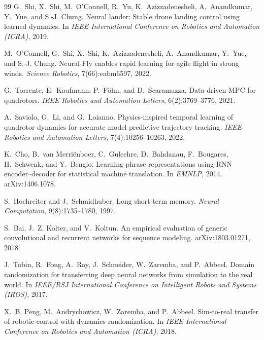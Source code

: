 \documentclass[11pt,a4paper,twoside,openright]{report}
\theoremstyle{plain}
\theoremstyle{definition}
\theoremstyle{remark}
\begin{document}
\begin{thebibliography}{99}
		G.~Shi, X.~Shi, M.~O'Connell, R.~Yu, K.~Azizzadenesheli, A.~Anandkumar, Y.~Yue,
		and S.-J. Chung.
		\newblock Neural lander: Stable drone landing control using learned dynamics.
		\newblock In \emph{IEEE International Conference on Robotics and Automation
			(ICRA)}, 2019.

		M.~O'Connell, G.~Shi, X.~Shi, K.~Azizzadenesheli, A.~Anandkumar, Y.~Yue, and
		S.-J. Chung.
		\newblock Neural-Fly enables rapid learning for agile flight in strong winds.
		\newblock \emph{Science Robotics}, 7(66):eabm6597, 2022.

		G.~Torrente, E.~Kaufmann, P.~F\"ohn, and D.~Scaramuzza.
		\newblock Data-driven MPC for quadrotors.
		\newblock \emph{IEEE Robotics and Automation Letters}, 6(2):3769--3776, 2021.

		A.~Saviolo, G.~Li, and G.~Loianno.
		\newblock Physics-inspired temporal learning of quadrotor dynamics for accurate
		model predictive trajectory tracking.
		\newblock \emph{IEEE Robotics and Automation Letters}, 7(4):10256--10263, 2022.

		K.~Cho, B.~van Merri\"enboer, C.~Gulcehre, D.~Bahdanau, F.~Bougares, H.~Schwenk,
		and Y.~Bengio.
		\newblock Learning phrase representations using RNN encoder--decoder for
		statistical machine translation.
		\newblock In \emph{EMNLP}, 2014. arXiv:1406.1078.

		S.~Hochreiter and J.~Schmidhuber.
		\newblock Long short-term memory.
		\newblock \emph{Neural Computation}, 9(8):1735--1780, 1997.

		S.~Bai, J.~Z. Kolter, and V.~Koltun.
		\newblock An empirical evaluation of generic convolutional and recurrent
		networks for sequence modeling.
		\newblock arXiv:1803.01271, 2018.

		J.~Tobin, R.~Fong, A.~Ray, J.~Schneider, W.~Zaremba, and P.~Abbeel.
		\newblock Domain randomization for transferring deep neural networks from
		simulation to the real world.
		\newblock In \emph{IEEE/RSJ International Conference on Intelligent Robots and
			Systems (IROS)}, 2017.

		X.~B. Peng, M.~Andrychowicz, W.~Zaremba, and P.~Abbeel.
		\newblock Sim-to-real transfer of robotic control with dynamics randomization.
		\newblock In \emph{IEEE International Conference on Robotics and Automation
			(ICRA)}, 2018.


\end{thebibliography}
\end{document}
